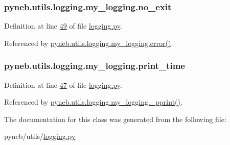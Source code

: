 \hypertarget{classpyneb_1_1utils_1_1logging_1_1my__logging_aa84eff388fc826a600e063d8cf7c4f63}{}
\subsubsection[{no\+\_\+exit}]{\setlength{\rightskip}{0pt plus 5cm}pyneb.\+utils.\+logging.\+my\+\_\+logging.\+no\+\_\+exit}\label{classpyneb_1_1utils_1_1logging_1_1my__logging_aa84eff388fc826a600e063d8cf7c4f63}


Definition at line \hyperlink{logging_8py_source_l00049}{49} of file \hyperlink{logging_8py_source}{logging.\+py}.



Referenced by \hyperlink{logging_8py_source_l00099}{pyneb.\+utils.\+logging.\+my\+\_\+logging.\+error()}.

\hypertarget{classpyneb_1_1utils_1_1logging_1_1my__logging_aba4514cb95d832e8abf7f31f77c27606}{}
\subsubsection[{print\+\_\+time}]{\setlength{\rightskip}{0pt plus 5cm}pyneb.\+utils.\+logging.\+my\+\_\+logging.\+print\+\_\+time}\label{classpyneb_1_1utils_1_1logging_1_1my__logging_aba4514cb95d832e8abf7f31f77c27606}


Definition at line \hyperlink{logging_8py_source_l00047}{47} of file \hyperlink{logging_8py_source}{logging.\+py}.



Referenced by \hyperlink{logging_8py_source_l00051}{pyneb.\+utils.\+logging.\+my\+\_\+logging.\+\_\+pprint()}.



The documentation for this class was generated from the following file\+:\begin{DoxyCompactItemize}
\item 
pyneb/utils/\hyperlink{logging_8py}{logging.\+py}\end{DoxyCompactItemize}
